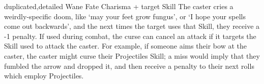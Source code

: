   {duplicated,detailed}%
  {Wane}%
  {Fate}%
  {Charisma + target Skill}%
  {The caster cries a weirdly-specific doom, like `may your feet grow fungus', or `I hope your spells come out backwards', and the next  times the target uses that Skill, they receive a -1 penalty.}%
  {If used during combat, the curse can cancel an attack if it targets the Skill used to attack the caster.
  For example, if someone aims their bow at the caster, the caster might curse their Projectiles Skill; a miss would imply that they fumbled the arrow and dropped it, and then receive a penalty to their next  rolls which employ Projectiles.}%
  {}
